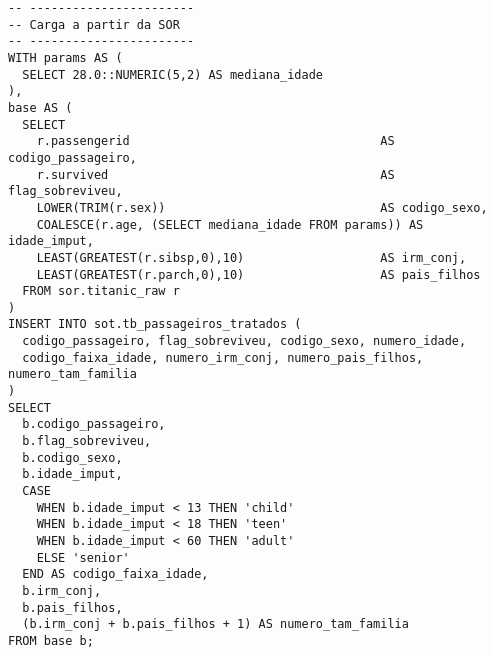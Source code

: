 \documentclass[12pt,a4paper]{article}
\begin{document}
\begin{verbatim}
-- -----------------------
-- Carga a partir da SOR
-- -----------------------
WITH params AS (
  SELECT 28.0::NUMERIC(5,2) AS mediana_idade
),
base AS (
  SELECT
    r.passengerid                                   AS codigo_passageiro,
    r.survived                                      AS flag_sobreviveu,
    LOWER(TRIM(r.sex))                              AS codigo_sexo,
    COALESCE(r.age, (SELECT mediana_idade FROM params)) AS idade_imput,
    LEAST(GREATEST(r.sibsp,0),10)                   AS irm_conj,
    LEAST(GREATEST(r.parch,0),10)                   AS pais_filhos
  FROM sor.titanic_raw r
)
INSERT INTO sot.tb_passageiros_tratados (
  codigo_passageiro, flag_sobreviveu, codigo_sexo, numero_idade,
  codigo_faixa_idade, numero_irm_conj, numero_pais_filhos, numero_tam_familia
)
SELECT
  b.codigo_passageiro,
  b.flag_sobreviveu,
  b.codigo_sexo,
  b.idade_imput,
  CASE
    WHEN b.idade_imput < 13 THEN 'child'
    WHEN b.idade_imput < 18 THEN 'teen'
    WHEN b.idade_imput < 60 THEN 'adult'
    ELSE 'senior'
  END AS codigo_faixa_idade,
  b.irm_conj,
  b.pais_filhos,
  (b.irm_conj + b.pais_filhos + 1) AS numero_tam_familia
FROM base b;
\end{verbatim}
\end{document}
